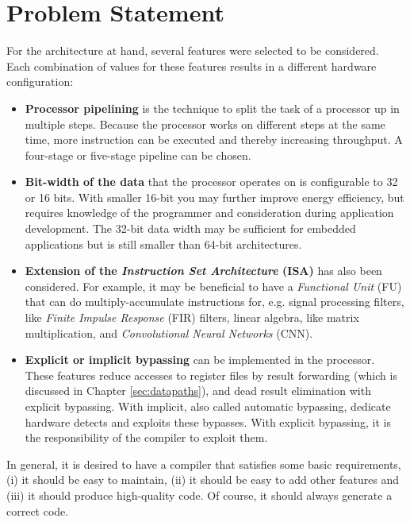 \section{Problem Statement}\label{sec:problem_statement}
For the architecture at hand, several features were selected to be considered. Each combination of values for these features results in a different hardware configuration:
\begin{itemize}
\item \textbf{Processor pipelining} is the technique to split the task of a processor up in multiple steps. Because the processor works on different steps at the same time, more instruction can be executed and thereby increasing throughput. A four-stage or five-stage pipeline can be chosen. %
\item	\textbf{Bit-width of the data} that the processor operates on is configurable to 32 or 16 bits. With smaller 16-bit you may further improve energy efficiency, but requires knowledge of the programmer and consideration during application development. The 32-bit data width may be sufficient for embedded applications but is still smaller than 64-bit architectures.
\item	\textbf{Extension of the \emph{Instruction Set Architecture} (ISA)} has also been considered. For example, it may be beneficial to have a  \emph{Functional Unit} (FU) that can do multiply-accumulate instructions for, e.g. signal processing filters, like \emph{Finite Impulse Response} (FIR) filters, linear algebra, like matrix multiplication, and \emph{Convolutional Neural Networks} (CNN). %
\item \textbf{Explicit or implicit bypassing} can be implemented in the processor. These features reduce accesses to register files by result forwarding (which is discussed in Chapter \ref{sec:datapaths}), and dead result elimination with explicit bypassing. With implicit, also called automatic bypassing, dedicate hardware detects and exploits these bypasses. With explicit bypassing, it is the responsibility of the compiler to exploit them.
\end{itemize}

In general, it is desired to have a compiler that satisfies some basic requirements, (i) it should be easy to maintain, (ii) it should be easy to add other features and (iii) it should produce high-quality code. Of course, it should always generate a correct code.

